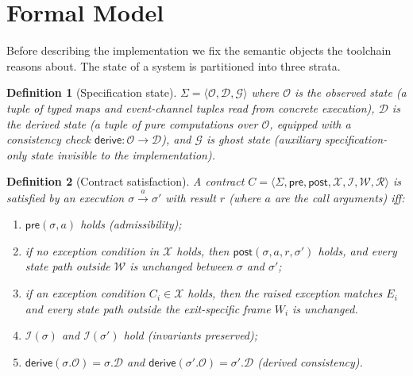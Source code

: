 \documentclass[11pt,a4paper]{article}
\newtheorem{definition}{Definition}
\begin{document}
\section{Formal Model}\label{sec:model}

Before describing the implementation we fix the semantic objects the
toolchain reasons about.  The state of a system is partitioned into
three strata.

\begin{definition}[Specification state]
$\Sigma = \langle \mathcal{O}, \mathcal{D}, \mathcal{G} \rangle$ where
$\mathcal{O}$ is the \emph{observed state} (a tuple of typed maps and
event-channel tuples read from concrete execution),
$\mathcal{D}$ is the \emph{derived state} (a tuple of pure
computations over $\mathcal{O}$, equipped with a consistency check
$\mathsf{derive}:\mathcal{O}\to\mathcal{D}$),
and $\mathcal{G}$ is \emph{ghost state} (auxiliary specification-only
state invisible to the implementation).
\end{definition}

\begin{definition}[Contract satisfaction]
A contract $C = \langle \Sigma, \mathsf{pre}, \mathsf{post}, \mathcal{X},
\mathcal{I}, \mathcal{W}, \mathcal{R} \rangle$ is \emph{satisfied} by
an execution $\sigma \xrightarrow{a} \sigma'$ with result $r$ (where
$a$ are the call arguments) iff:
\begin{enumerate}[label=(\roman*),nosep]
\item $\mathsf{pre}(\sigma, a)$ holds (admissibility);
\item if no exception condition in $\mathcal{X}$ holds, then
  $\mathsf{post}(\sigma, a, r, \sigma')$ holds, and every state path
  outside $\mathcal{W}$ is unchanged between $\sigma$ and $\sigma'$;
\item if an exception condition $C_i \in \mathcal{X}$ holds, then the
  raised exception matches $E_i$ and every state path outside the
  exit-specific frame $W_i$ is unchanged.
\item $\mathcal{I}(\sigma)$ and $\mathcal{I}(\sigma')$ hold
  (invariants preserved);
\item $\mathsf{derive}(\sigma.\mathcal{O}) = \sigma.\mathcal{D}$ and
  $\mathsf{derive}(\sigma'.\mathcal{O}) = \sigma'.\mathcal{D}$
  (derived consistency).
\end{enumerate}
\end{definition}
\end{document}
